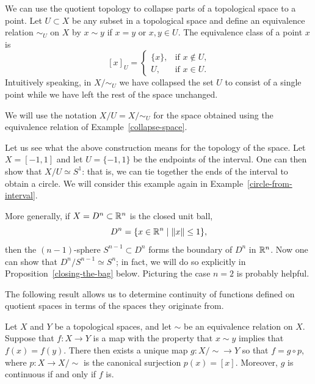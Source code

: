\begin{example}
  \label{collapse-space}
  We can use the quotient topology to collapse parts of a topological space to a point. Let $U \subset X$ be any subset in a topological space and define an equivalence relation $\sim_U$ on $X$ by $x \sim y$ if $x = y$ or $x,y \in U$. The equivalence class of a point $x$ is
  \[
    [x]_U = \begin{cases} \{x\},& \text{if $x \notin U$,} \\ U,& \text{if $x \in U$.} \end{cases}
  \]
  Intuitively speaking, in $X/\!\sim_U$ we have collapsed the set $U$ to consist of a single point while we have left the rest of the space unchanged.
\end{example}
We will use the notation $X/U = X/\!\sim_U$ for the space obtained using the equivalence relation of Example~\ref{collapse-space}.
\begin{example}
  \label{bag-closing-example}
  Let us see what the above construction means for the topology of the space. Let $X = [-1,1]$ and let $U = \{-1,1\}$ be the endpoints of the interval. One can then show that $X/U \simeq S^1$: that is, we can tie together the ends of the interval to obtain a circle. We will consider this example again in Example~\ref{circle-from-interval}.
  
  More generally, if $X = D^n \subset \mathbb{R}^n$ is the closed unit ball, 
  \[
    D^n = \{x \in \mathbb{R}^n \mid \lVert x \rVert \leq 1 \},
  \]
  then the $(n-1)$-sphere $S^{n-1} \subset D^n$ forms the boundary of $D^n$ in $\mathbb{R}^n$. Now one can show that $D^n/S^{n-1} \simeq S^n$; in fact, we will do so explicitly in Proposition~\ref{closing-the-bag} below. Picturing the case $n = 2$ is probably helpful.
\end{example}
The following result allows us to determine continuity of functions defined on quotient spaces in terms of the spaces they originate from.
\begin{lem}
  \label{universal-property-quotients}
  Let $X$ and $Y$ be a topological spaces, and let $\sim$ be an equivalence relation on $X$. Suppose that $f : X \to Y$ is a map with the property that $x \sim y$ implies that $f(x) = f(y)$. There then exists a unique map $g : X /\!\sim \to Y$ so that $f = g \circ p$, where $p : X \to X/\!\sim$ is the canonical surjection $p(x) = [x]$. Moreover, $g$ is continuous if and only if $f$ is.
\end{lem}
